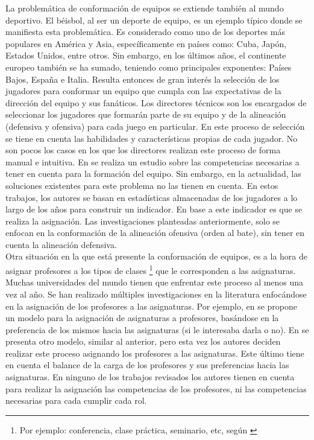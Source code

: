 La problemática de conformación de equipos se extiende también al mundo deportivo. El béisbol, al ser un deporte de equipo, es un ejemplo típico donde se manifiesta esta problemática. Es considerado como uno de los deportes más populares en América y Asia, específicamente en países como: Cuba, Japón, Estados Unidos, entre otros. Sin embargo, en los últimos años, el continente europeo también se ha sumado, teniendo como principales exponentes: Países Bajos, España e Italia. Resulta entonces de gran interés la selección de los jugadores para conformar un equipo que cumpla con las expectativas de la dirección del equipo y sus fanáticos. Los directores técnicos son los encargados de seleccionar los jugadores que formarán parte de su equipo y de la alineación (defensiva y ofensiva) para cada juego en particular. En este proceso de selección se tiene en cuenta las habilidades y características propias de cada jugador. No son pocos los casos en los que los directores realizan este proceso de forma manual e intuitiva. En \cite{Smith1995} se realiza un estudio sobre las competencias necesarias a tener en cuenta para la formación del equipo. Sin embargo, en la actualidad, las soluciones existentes para este problema \cite{Polyashuk2015, Sugrue2007} no las tienen en cuenta. En estos trabajos, los autores se basan en estadísticas almacenadas de los jugadores a lo largo de los años para construir un indicador. En base a este indicador es que se realiza la asignación. Las investigaciones planteadas anteriormente, solo se enfocan en la conformación de la alineación ofensiva (orden al bate), sin tener en cuenta la alineación defensiva.  \\

Otra situación en la que está presente la conformación de equipos, es a la hora de asignar profesores a los tipos de clases \footnote{Por ejemplo: conferencia, clase práctica, seminario, etc, según \cite{res2018}} que le corresponden a las asignaturas. Muchas universidades del mundo tienen que enfrentar este proceso al menos una vez al año. Se han realizado múltiples investigaciones en la literatura enfocándose en la asignación de los profesores a las asignaturas. Por ejemplo, en \cite{Bosquez2020} se propone un modelo para la asignación de asignaturas a profesores, basándose en la preferencia de los mismos hacia las asignaturas (si le interesaba darla o no). En \cite{Domenech2014} se presenta otro modelo, similar al anterior, pero esta vez los autores deciden realizar este proceso asignando los profesores a las asignaturas. Este último tiene en cuenta el balance de la carga de los profesores y sus preferencias hacia las asignaturas. En ninguno de los trabajos revisados los autores tienen en cuenta para realizar la asignación las competencias de los profesores, ni las competencias necesarias para cada cumplir cada rol.\\

